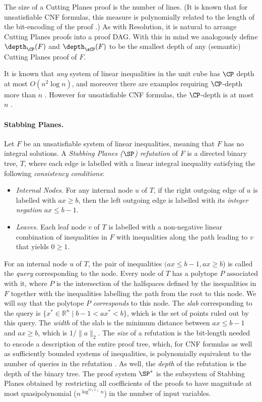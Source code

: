 The size of a Cutting Planes proof is the number of lines.
%
%
(It is known that for   %
unsatisfiable CNF %
formulas,  %
this measure is polynomially related to the length of the bit-encoding of
the proof \cite{CookCT87}.)   %
As with Resolution, it is natural to arrange Cutting Planes proofs into a proof DAG.
With this in mind we analogously define $\depth_{\CP}(F)$ and $\depth_{\sCP}(F)$
to be the smallest depth of any (semantic) Cutting Planes proof of $F$. 

It is known that \emph{any} system of linear inequalities in the unit cube has $\CP$ depth at most
$O(n^2 \log n)$, and moreover there
are examples requiring $\CP$-depth more than $n$ \cite{EisenbrandS99}.
However for unsatisfiable CNF formulas,
the $\CP$-depth is at most $n$ \cite{BockmayrEHS99}.

\paragraph{Stabbing Planes.}
Let $F$ be an unsatisfiable system of linear inequalities, meaning that $F$ has no integral solutions.  %
%
%
%
A \emph{Stabbing Planes ($\SP$) refutation} of $F$ is a directed binary tree, $T$, where each edge is labelled with a linear integral inequality satisfying the following \emph{consistency conditions}:
\begin{itemize}
	\item \emph{Internal Nodes.} For any internal node $u$ of $T$, if the right outgoing edge of $u$ is labelled with $ax \geq b$, then the left outgoing edge is labelled with its \emph{integer negation} $ax \leq  b-1 $.
	\item \emph{Leaves.} Each leaf node $v$ of $T$ is labelled with a non-negative linear combination of inequalities in $F$ with inequalities along the path leading to $v$ that yields $0 \geq 1$.
\end{itemize}
For an internal node $u$ of $T$, the pair of inequalities $(ax \le b-1, ax \ge b$) is called the \emph{query} corresponding to the node. Every node of $T$ has a polytope $P$ associated with it, where $P$ is the
%
intersection of the halfspaces defined by the inequalities %
%
%
in $F$ together with the inequalities labelling the path from the root to this node. We will say that the polytope $P$ \emph{corresponds} to this node. 
The \emph{slab} corresponding to the query is $\{ x^* \in \mathbb{R}^n \mid b-1 < ax^* < b \}$, which is the set of points ruled out by this query. The \emph{width} of the slab is the minimum distance between $ax \leq b-1$ and $ax \geq b$, which is $1/\|a\|_2$.
The \emph{size} of a refutation is the bit-length needed to encode a description of the entire proof tree, which, for CNF formulas as well as sufficiently bounded systems of inequalities, is polynomially equivalent to the number of queries  in the refutation \cite{TseitinUpperBound}.
As well, the \emph{depth} of the refutation is the depth of the binary tree.
The proof system $\SP^*$ is the subsystem of Stabbing Planes obtained by restricting all coefficients of the proofs to have magnitude at most quasipolynomial ($n^{\log^{O(1)} n}$) in the number of input variables.

